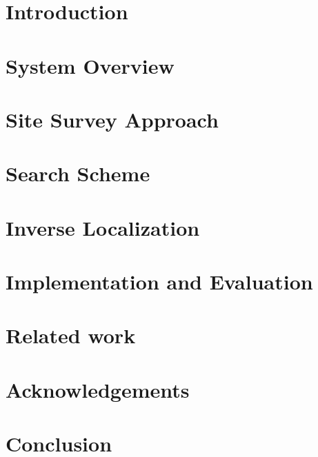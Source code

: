 \documentclass[10pt, conference, letterpaper]{IEEEtran}
\begin{document}
\section{Introduction}
\label{sec:introduction}


\section{System Overview}
\label{sec:over}


\section{Site Survey Approach}
\label{sec:site}


\section{Search Scheme}
\label{sec:search}


\section{Inverse Localization}
\label{sec:inverse}


%

\section{Implementation and Evaluation}
\label{sec:eva}


\section{Related work}
\label{sec:review}


\section{Acknowledgements}
\label{sec:ack}


\section{Conclusion}
\label{sec:conclusion}


{\small


}
\end{document}
